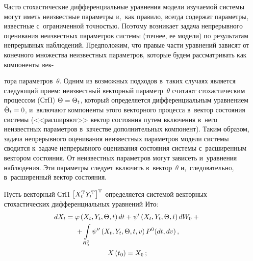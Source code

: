 \begin{multicols}{2}
Часто стохастические дифференциальные уравнения модели изучаемой системы могут
иметь неизвестные параметры и,~как правило, всегда содержат
параметры, известные с~ограниченной точностью. Поэтому возникает
задача непрерывного оценивания неизвестных параметров системы
(точнее, ее модели) по результатам непрерывных наблюдений.
Предположим, что правые части уравнений зависят от конечного множества 
неизвестных параметров, которые
будем рассматривать как компоненты век-\linebreak\vspace*{-12pt}

\pagebreak

\noindent
тора параметров~$\theta$.
Одним из возможных подходов в~таких случаях является следующий
прием: неизвестный векторный параметр~$\theta$ считают стохастическим
процессом  (СтП) $\Theta \hm=\Theta_t$, который определяется
дифференциальным уравнением $\dot\Theta_t \hm=0$, и~включают
компоненты этого векторного процесса в~вектор состояния системы
(<<расширяют>> вектор состояния путем включения в~него неизвестных
параметров в~качестве дополнительных компонент).
Таким образом, задача непрерывного оценивания неизвестных
параметров модели системы сводится к~задаче непрерывного
оценивания состояния системы с~расширенным вектором состояния.
От неизвестных параметров могут зависеть и~уравнения наблюдения. 
Эти параметры следует включить 
в~вектор~$\theta$ и,~следовательно, в~расширенный вектор состояния.

Пусть векторный СтП $\left[ X_t^{\mathrm{T}} Y_t^{\mathrm{T}} \right]^{\mathrm{T}}$
определяется системой векторных стохастических дифференциальных
уравнений Ито:
   \begin{multline}
    dX_t =\varphi \left(X_t,Y_t,\Theta, t\right) dt + \psi' \left(X_t,Y_t,\Theta, t\right) 
    dW_0 +{}\\ 
{}+\int\limits_{R_0^q} \psi''
    \left(X_t,Y_t,\Theta, t,v\right) P^0 (dt, dv)\,,\\ X\left(t_0\right) = X_0\,;
    \label{e2.1-s1}
    \end{multline}
    
    \vspace*{-12pt}
    

\end{multicols}
